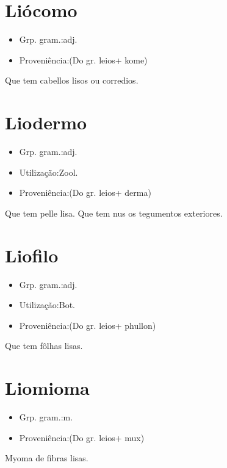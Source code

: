 \section{Liócomo}
\begin{itemize}
\item {Grp. gram.:adj.}
\end{itemize}
\begin{itemize}
\item {Proveniência:(Do gr. \textunderscore leios\textunderscore  + \textunderscore kome\textunderscore )}
\end{itemize}
Que tem cabellos lisos ou corredios.
\section{Liodermo}
\begin{itemize}
\item {Grp. gram.:adj.}
\end{itemize}
\begin{itemize}
\item {Utilização:Zool.}
\end{itemize}
\begin{itemize}
\item {Proveniência:(Do gr. \textunderscore leios\textunderscore  + \textunderscore derma\textunderscore )}
\end{itemize}
Que tem pelle lisa.
Que tem nus os tegumentos exteriores.
\section{Liofilo}
\begin{itemize}
\item {Grp. gram.:adj.}
\end{itemize}
\begin{itemize}
\item {Utilização:Bot.}
\end{itemize}
\begin{itemize}
\item {Proveniência:(Do gr. \textunderscore leios\textunderscore  + \textunderscore phullon\textunderscore )}
\end{itemize}
Que tem fôlhas lisas.
\section{Liomioma}
\begin{itemize}
\item {Grp. gram.:m.}
\end{itemize}
\begin{itemize}
\item {Proveniência:(Do gr. \textunderscore leios\textunderscore  + \textunderscore mux\textunderscore )}
\end{itemize}
Myoma de fibras lisas.
